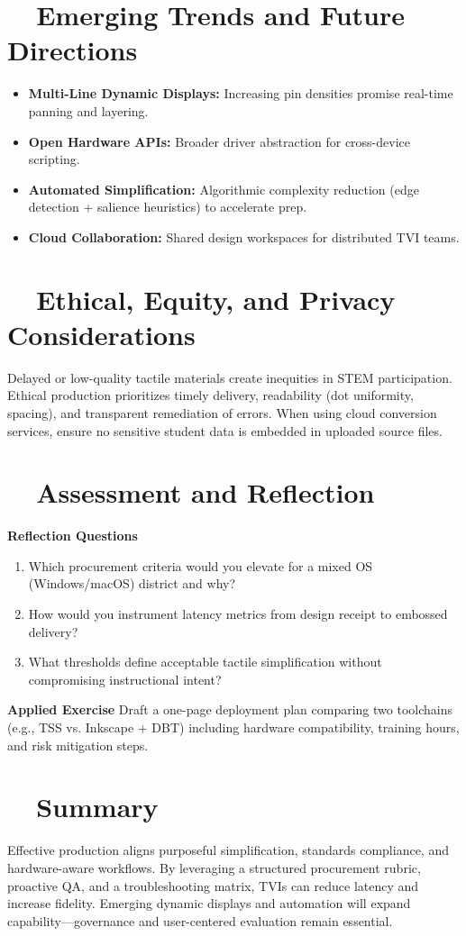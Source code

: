 \section{~~Emerging Trends and Future Directions}\label{ch14:sec:emerging-trends}
\begin{itemize}
	\item \textbf{Multi-Line Dynamic Displays:} Increasing pin densities promise real-time panning and layering.
	\item \textbf{Open Hardware APIs:} Broader driver abstraction for cross-device scripting.
	\item \textbf{Automated Simplification:} Algorithmic complexity reduction (edge detection + salience heuristics) to accelerate prep.
	\item \textbf{Cloud Collaboration:} Shared design workspaces for distributed TVI teams.
\end{itemize}

\section{~~Ethical, Equity, and Privacy Considerations}\label{ch14:sec:ethics-equity}
Delayed or low-quality tactile materials create inequities in STEM participation. Ethical production prioritizes timely delivery, readability (dot uniformity, spacing), and transparent remediation of errors. When using cloud conversion services, ensure no sensitive student data is embedded in uploaded source files.

\section{~~Assessment and Reflection}\label{ch14:sec:assessment-reflection}
\textbf{Reflection Questions}
\begin{enumerate}
	\item Which procurement criteria would you elevate for a mixed OS (Windows/macOS) district and why?
	\item How would you instrument latency metrics from design receipt to embossed delivery?
	\item What thresholds define acceptable tactile simplification without compromising instructional intent?
\end{enumerate}
\textbf{Applied Exercise} Draft a one-page deployment plan comparing two toolchains (e.g., TSS vs. Inkscape + DBT) including hardware compatibility, training hours, and risk mitigation steps.

\section{~~Summary}\label{ch14:sec:summary}
Effective  production aligns purposeful simplification, standards compliance, and hardware-aware workflows. By leveraging a structured procurement rubric, proactive QA, and a troubleshooting matrix, TVIs can reduce latency and increase fidelity. Emerging dynamic displays and automation will expand capability—governance and user-centered evaluation remain essential.


